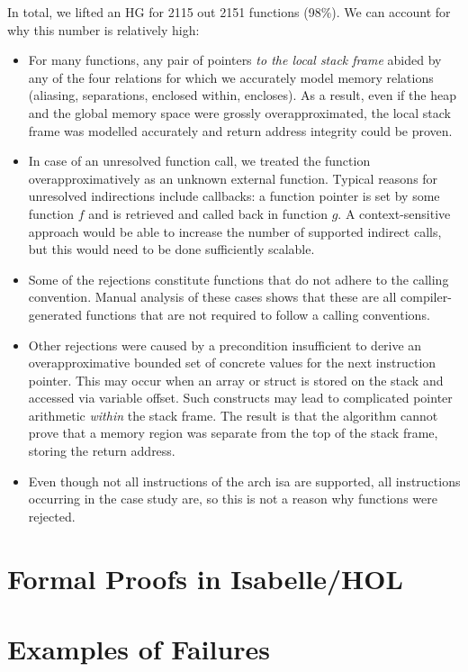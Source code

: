 In total, we lifted an HG for 2115 out 2151 functions (98\%).
We can account for why this number is relatively high:
\begin{itemize}[wide, labelwidth=!, labelindent=0pt,nosep]
  \item For many functions, any pair of pointers \emph{to the local stack frame} abided by any of the four relations for which we accurately model memory relations (aliasing, separations, enclosed within, encloses).
  As a result, even if the heap and the global memory space were grossly overapproximated, the local stack frame was modelled accurately and return address integrity could be proven.
  \item In case of an unresolved function call, we treated the function overapproximatively as an unknown external function.
  Typical reasons for unresolved indirections include callbacks: a function pointer is set by some function $f$ and is retrieved and called back in function $g$. A context-sensitive approach would be able to increase the number of supported indirect calls, but this would need to be done sufficiently scalable.
  \item Some of the rejections constitute functions that do not adhere to the calling convention. Manual analysis of these cases shows that these are all compiler-generated functions that are not required to follow a calling conventions.
  \item Other rejections were caused by a precondition insufficient to derive an overapproximative bounded set of concrete values for the next instruction pointer.
  This may occur when an array or struct is stored on the stack and accessed via variable offset.
  Such constructs may lead to complicated pointer arithmetic \emph{within} the stack frame.
  The result is that the algorithm cannot prove that a memory region was separate from the top of the stack frame, storing the return address.
  \item Even though not all instructions of the \gls{arch} \ac{isa} are supported, all instructions occurring in the case study are, so this is not a reason why functions were rejected.
\end{itemize}

\section{Formal Proofs in Isabelle/HOL}

\section{Examples of Failures}
